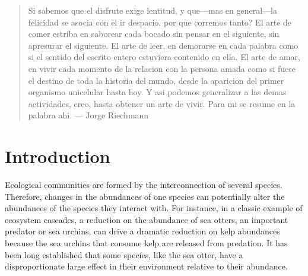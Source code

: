 
\usepackage{Sweave}




\maketitle

\begin{abstract}
\noindent Si sabemos que el disfrute exige lentitud, y que---mas en general---la felicidad se asocia con el ir despacio, por que corremos tanto? El arte de comer estriba en saborear cada bocado sin pensar en el siguiente, sin apresurar el siguiente. El arte de leer, en demorarse en cada palabra como si el sentido del escrito entero estuviera contenido en ella. El arte de amar, en vivir cada momento de la relacion con la persona amada como si fuese el destino de toda la historia del mundo, desde la aparicion del primer organismo unicelular hasta hoy. Y asi podemos generalizar a las demas actividades, creo, hasta obtener un arte de vivir. Para mi se resume en la palabra ahi. --- Jorge Riechmann
\end{abstract}


\linenumbers
\setlength\linenumbersep{15pt}
\renewcommand\linenumberfont{\normalfont\footnotesize\sffamily\color{gray}}

\onehalfspacing


\section*{Introduction}

Ecological communities are formed by the interconnection of several species. Therefore, changes in the abundances of one species can potentially alter the abundances of the species they interact with. For instance, in a classic example of ecosystem cascades, a reduction on the abundance of sea otters, an important predator or sea urchins, can drive a dramatic reduction on kelp abundances because the sea urchins that consume kelp are released from predation. It has been long established that some species, like the sea otter, have a disproportionate large effect in their environment relative to their abundance. 

